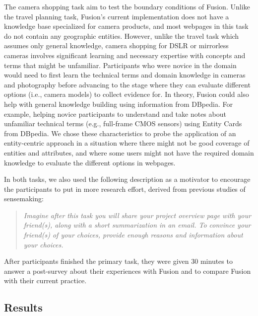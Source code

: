 \noindent The camera shopping task aim to test the boundary conditions of Fusion. Unlike the travel planning task, Fusion's current implementation does not have a knowledge base specialized for camera products, and most webpages in this task do not contain any geographic entities. However, unlike the travel task which assumes only general knowledge, camera shopping for DSLR or mirrorless cameras involves significant learning and necessary expertise with concepts and terms that might be unfamiliar. Participants who were novice in the domain would need to first learn the technical terms and domain knowledge in cameras and photography before advancing to the stage where they can evaluate different options (i.e., camera models) to collect evidence for. In theory, Fusion could also help with general knowledge building using information from DBpedia. For example, helping novice participants to understand and take notes about unfamiliar technical terms (e.g., full-frame CMOS sensors) using Entity Cards from DBpedia. We chose these characteristics to probe the application of an entity-centric approach in a situation where there might not be good coverage of entities and attributes, and where some users might not have the required domain knowledge to evaluate the different options in webpages. 

In both tasks, we also used the following description as a motivator to encourage the participants to put in more research effort, derived from previous studies of sensemaking:

\begin{quote}
    \emph{
Imagine after this task you will share your project overview page with your friend(s), along with a short summarization in an email. To convince your friend(s) of your choices, provide enough reasons and information about your choices.
    }
\end{quote}

\noindent After participants finished the primary task, they were given 30 minutes to answer a post-survey about their experiences with Fusion and to compare Fusion with their current practice.

\subsection{Results}



